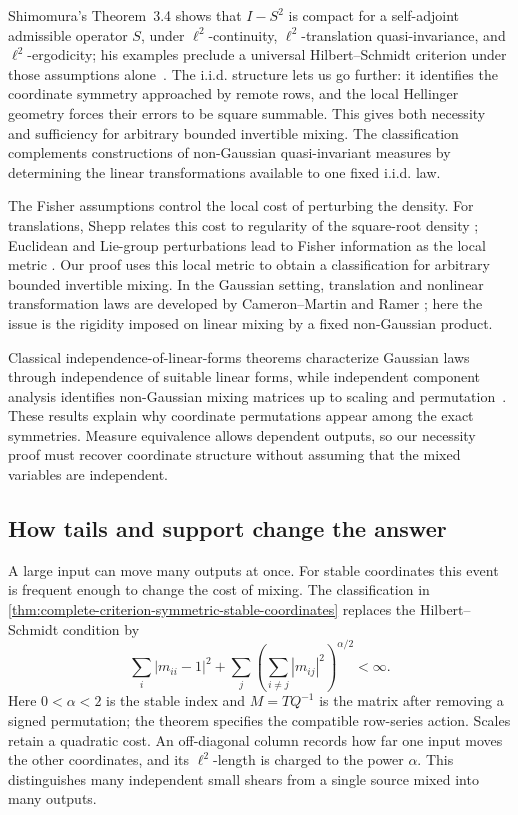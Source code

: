 Shimomura's Theorem~3.4 shows that \(I-S^2\) is compact for a self-adjoint
admissible operator \(S\), under \(\ell^2\)-continuity,
\(\ell^2\)-translation quasi-invariance, and \(\ell^2\)-ergodicity; his
examples preclude a universal Hilbert--Schmidt criterion under those
assumptions alone~\cite{shimomura1977linear}. The i.i.d. structure lets us go
further: it identifies the coordinate symmetry approached by remote rows,
and the local Hellinger geometry forces their errors to be square summable.
This gives both necessity and sufficiency for arbitrary bounded invertible
mixing. The classification complements constructions of non-Gaussian
quasi-invariant measures \cite{feldman1961examples,takahashi1975quasi} by
determining the linear transformations available to one fixed i.i.d. law.

The Fisher assumptions control the local cost of perturbing the density.
For translations, Shepp relates this cost to regularity of the square-root
density \cite{shepp1965translate}; Euclidean and Lie-group perturbations
lead to Fisher information as the local metric
\cite{steele1986fisher,marques1992quasi}. Our proof uses this local metric
to obtain a classification for arbitrary bounded invertible mixing.
In the Gaussian setting, translation and nonlinear transformation laws
are developed by Cameron--Martin and Ramer
\cite{cameron1944transformations,ramer1974nonlinear}; here the issue is the
rigidity imposed on linear mixing by a fixed non-Gaussian product.

Classical independence-of-linear-forms theorems
\cite{kac1939characterization,darmois1953analyse,skitovich1954linear,kagan1973characterization}
characterize Gaussian laws through independence of suitable linear forms,
while independent component analysis identifies non-Gaussian mixing matrices
up to scaling and permutation~\cite{comon1994independent}. These results
explain why coordinate permutations appear among the exact symmetries.
Measure equivalence allows dependent outputs, so our necessity proof must
recover coordinate structure without assuming that the mixed variables are
independent.

\subsection{How tails and support change the answer}

A large input can move many outputs at once. For stable coordinates this
event is frequent enough to change the cost of mixing. The classification
in \cref{thm:complete-criterion-symmetric-stable-coordinates} replaces the
Hilbert--Schmidt condition by
\[
 \sum_i|m_{ii}-1|^2
 +\sum_j\left(\sum_{i\ne j}|m_{ij}|^2\right)^{\alpha/2}<\infty.
\]
Here \(0<\alpha<2\) is the stable index and \(M=TQ^{-1}\) is the matrix
after removing a signed permutation; the theorem specifies the compatible
row-series action. Scales retain a quadratic cost. An off-diagonal column
records how far one input moves the other coordinates, and its
\(\ell^2\)-length is charged to the power \(\alpha\). This distinguishes
many independent small shears from a single source mixed into many outputs.

